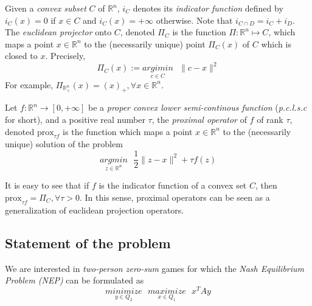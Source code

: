\documentclass[a4paper,9pt,journal]{IEEEtran}
\begin{document}
Given a \textit{convex subset} $C$ of $\mathbb{R}^n$, $i_C$ denotes its \textit{indicator function} defined by
$i_C(x) = 0$ if $x \in C$ and $i_C(x) = +\infty$ otherwise. Note that $i_{C \cap D} = i_C + i_D$. The \textit{euclidean projector} onto $C$, denoted $\Pi_C$ is the function
$\Pi: \mathbb{R}^n \mapsto C$, which maps a point $x \in \mathbb{R}^n$ to the (necessarily unique) point $\Pi_C(x)$ of $C$ which is closed to $x$. Precisely,
\begin{equation}
  \Pi_C(x) := \underset{c \in C}{argimin}\text{ }\|c - x\|^2
\end{equation}
For example, $\Pi_{\mathbb{R}^n_+}(x) = (x)_+, \forall x \in \mathbb{R}^n$.

Let $f : \mathbb{R}^n \rightarrow [0, +\infty]$ be a \textit{proper convex lower semi-continous function} (\textit{p.c.l.s.c} for short), and a positive real number $\tau$, the \textit{proximal operator} of $f$ of rank $\tau$,
denoted $\text{prox}_{\tau f}$ is the function which maps a point $x \in \mathbb{R}^n$ to the (necessarily unique) solution of the problem
\begin{equation}
  \underset{z \in \mathbb{R}^n}{argmin}\text{ }\frac{1}{2}\|z - x\|^2 + \tau f(z)
\end{equation}

It is easy to see that if $f$ is the indicator function of a convex set $C$, then $\text{prox}_{\tau f} = \Pi_C, \forall \tau > 0$. In this sense, proximal operators can be seen
as a generalization of euclidean projection operators.
\subsection{Statement of the problem}
We are interested in \textit{two-person zero-sum} games for which the \textit{Nash Equilibrium Problem (NEP)} can be formulated as
\begin{equation}
  \underset{y \in Q_2}{minimize}\text{ }\underset{x \in Q_1}{maximize}\text{ }{x^TAy}
  \label{eq:opt_pb}
\end{equation}
\end{document}
